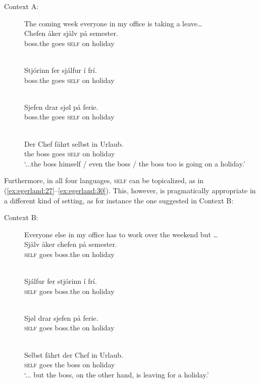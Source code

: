 \documentclass[output=paper]{LSP/langsci}
\begin{document}
\begin{description}
\item[Context A:] The coming week everyone in my office is taking a leave…
\ea\label{ex:egerland:23}
\\
\gll Chefen  åker  själv  på  semester.\\
boss.the  goes  \textsc{self}  on  holiday\\
\z

\ea\label{ex:egerland:24}
\\
\gll Stjórinn  fer    sjálfur  í  frí.\\
boss.the  goes  \textsc{self}    on  holiday\\
\z

\ea\label{ex:egerland:25}
\\
\gll Sjefen  drar  sjøl  på ferie.\\
boss.the  goes  \textsc{self}  on  holiday\\
\z

\ea\label{ex:egerland:26}
\\
\gll Der  Chef  fährt  selbst    in  Urlaub.\\
the  boss  goes  \textsc{self}    on  holiday\\
\glt ‘...the boss himself / even the boss / the boss too is going on a holiday.’
\z
\end{description}

Furthermore, in all four languages, \textsc{self} can be topicalized, as in (\ref{ex:egerland:27}--\ref{ex:egerland:30}). This, however, is pragmatically appropriate in a different kind of setting, as for instance the one suggested in Context B:

\newpage 
\begin{description}
\item[Context B:] Everyone else in my office has to work over the weekend but …
\ea\label{ex:egerland:27}
\\
\gll Själv  åker  chefen  på  semester.\\
\textsc{self}  goes boss.the  on  holiday\\
\z

\ea\label{ex:egerland:28}
\\
\gll Sjálfur  fer    stjórinn    í  frí.\\
\textsc{self}    goes  boss.the    on  holiday\\
\z

\ea\label{ex:egerland:29}
\\
\gll Sjøl  drar  sjefen  på  ferie.\\
\textsc{self}  goes  boss.the  on  holiday\\
\z

\ea\label{ex:egerland:30}
\\
\gll Selbst  fährt  der  Chef  in  Urlaub.\\
\textsc{self}    goes  the  boss  on  holiday\\
\glt ‘... but the boss, on the other hand, is leaving for a holiday.’
\z
\end{description}
\end{document}
